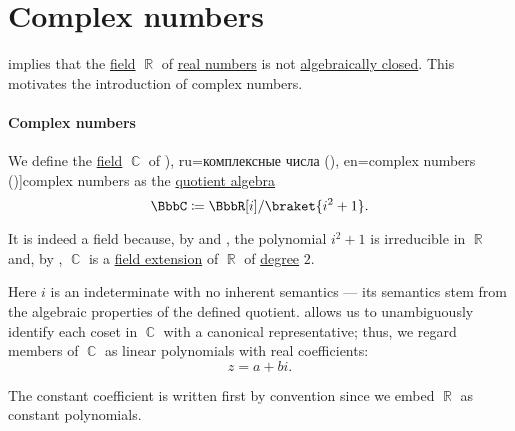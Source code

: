 \section{Complex numbers}\label{sec:complex_numbers}

 implies that the \hyperref[def:field]{field} \( \BbbR \) of \hyperref[def:real_numbers]{real numbers} is not \hyperref[def:algebraically_closed_field]{algebraically closed}. This motivates the introduction of complex numbers.

\paragraph{Complex numbers}

\begin{definition}\label{def:complex_numbers}\mimprovised
  We define the \hyperref[def:field]{field} \( \BbbC \) of \term[bg=комплексни числа (\cite[296]{ИлинСадовничиСендов1984АнализТом1}), ru=комплексные числа (\cite[12]{Маркушевич1967АналитическиеФункцииТом1}), en=complex numbers (\cite[1]{Ahlfors1979ComplexAnalysis})]{complex numbers} as the \hyperref[def:algebra_over_ring/quotient]{quotient algebra}
  \begin{equation}\label{eq:def:complex_numbers/quotient}
    \BbbC \coloneqq \BbbR[i] / \braket{ i^2 + 1 }.
  \end{equation}

  It is indeed a field because, by  and , the polynomial \( i^2 + 1 \) is irreducible in \( \BbbR \) and, by , \( \BbbC \) is a \hyperref[def:field/submodel]{field extension} of \( \BbbR \) of \hyperref[def:field_extension_degree]{degree} \( 2 \).

  Here \( i \) is an indeterminate with no inherent semantics --- its semantics stem from the algebraic properties of the defined quotient.  allows us to unambiguously identify each coset in \( \BbbC \) with a canonical representative; thus, we regard members of \( \BbbC \) as linear polynomials with real coefficients:
  \begin{equation}\label{eq:def:complex_numbers/number}
    z = a + bi.
  \end{equation}

  The constant coefficient is written first by convention since we embed \( \BbbR \) as constant polynomials.


\end{definition}
